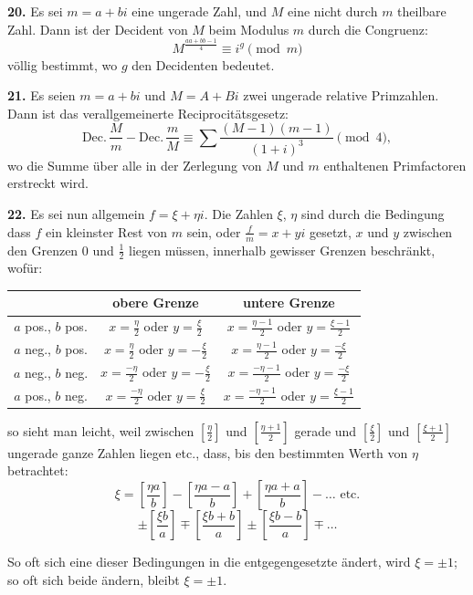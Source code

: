 \documentclass[12pt,a4paper]{article}
\begin{document}
\textbf{20.} Es sei $m = a + bi$ eine ungerade Zahl, und $M$ eine nicht durch $m$ theilbare Zahl.
Dann ist der Decident von $M$ beim Modulus $m$ durch die Congruenz:
\[
M^{\frac{aa + bb - 1}{4}} \equiv i^g \pmod{m}
\]
völlig bestimmt, wo $g$ den Decidenten bedeutet.

\textbf{21.} Es seien $m = a + bi$ und $M = A + Bi$ zwei ungerade relative Primzahlen. Dann
ist das verallgemeinerte Reciprocitätsgesetz:
\[
\text{Dec.}\,\frac{M}{m} - \text{Dec.}\,\frac{m}{M} \equiv \sum \frac{(M - 1)(m - 1)}{(1 + i)^3} \pmod{4},
\]
wo die Summe über alle in der Zerlegung von $M$ und $m$ enthaltenen Primfactoren erstreckt
wird.

\newpage


\textbf{22.} Es sei nun allgemein $f = \xi + \eta i$. Die Zahlen $\xi$, $\eta$ sind durch die Bedingung
dass $f$ ein kleinster Rest von $m$ sein, oder $\frac{f}{m} = x + yi$ gesetzt, $x$ und $y$ zwischen den
Grenzen $0$ und $\frac{1}{2}$ liegen müssen, innerhalb gewisser Grenzen beschränkt, wofür:

\begin{center}
\begin{tabular}{c|c|c}
 & obere Grenze & untere Grenze \\
\hline
$a$ pos., $b$ pos. & $x = \frac{\eta}{2}$ oder $y = \frac{\xi}{2}$ & $x = \frac{\eta - 1}{2}$ oder $y = \frac{\xi - 1}{2}$ \\
$a$ neg., $b$ pos. & $x = \frac{\eta}{2}$ oder $y = -\frac{\xi}{2}$ & $x = \frac{\eta - 1}{2}$ oder $y = \frac{-\xi}{2}$ \\
$a$ neg., $b$ neg. & $x = \frac{-\eta}{2}$ oder $y = -\frac{\xi}{2}$ & $x = \frac{-\eta - 1}{2}$ oder $y = \frac{-\xi}{2}$ \\
$a$ pos., $b$ neg. & $x = \frac{-\eta}{2}$ oder $y = \frac{\xi}{2}$ & $x = \frac{-\eta - 1}{2}$ oder $y = \frac{\xi - 1}{2}$
\end{tabular}
\end{center}

so sieht man leicht, weil zwischen $[\frac{\eta}{2}]$ und $[\frac{\eta + 1}{2}]$ gerade und $[\frac{\xi}{2}]$ und $[\frac{\xi + 1}{2}]$
ungerade ganze Zahlen liegen etc., dass, bis den bestimmten Werth von $\eta$ betrachtet:
\[
\xi = \left[\frac{\eta a}{b}\right] - \left[\frac{\eta a - a}{b}\right] + \left[\frac{\eta a + a}{b}\right] - \ldots \text{ etc.}
\]
\[
\pm \left[\frac{\xi b}{a}\right] \mp \left[\frac{\xi b + b}{a}\right] \pm \left[\frac{\xi b - b}{a}\right] \mp \ldots
\]

So oft sich eine dieser Bedingungen in die entgegengesetzte ändert, wird $\xi = \pm 1$; so oft
sich beide ändern, bleibt $\xi = \pm 1$.
\end{document}

